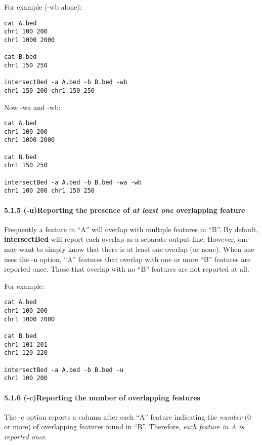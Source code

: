 \documentclass[letterpaper,10pt,english]{sphinxmanual}
\begin{document}
For example (-wb alone):

\begin{Verbatim}[commandchars=\\\{\}]
cat A.bed
chr1 100 200
chr1 1000 2000

cat B.bed
chr1 150 250

intersectBed -a A.bed -b B.bed -wb
chr1 150 200 chr1 150 250
\end{Verbatim}

Now -wa and -wb:

\begin{Verbatim}[commandchars=\\\{\}]
cat A.bed
chr1 100 200
chr1 1000 2000

cat B.bed
chr1 150 250

intersectBed -a A.bed -b B.bed -wa -wb
chr1 100 200 chr1 150 250
\end{Verbatim}


\paragraph{5.1.5 (-u)Reporting the presence of \emph{at least one} overlapping feature}
\label{content/intersectBed:u-reporting-the-presence-of-at-least-one-overlapping-feature}
Frequently a feature in ``A'' will overlap with multiple features in ``B''. By default, \textbf{intersectBed} will
report each overlap as a separate output line. However, one may want to simply know that there is at
least one overlap (or none). When one uses the -u option, ``A'' features that overlap with one or more
``B'' features are reported once. Those that overlap with no ``B'' features are not reported at all.

For example:

\begin{Verbatim}[commandchars=\\\{\}]
cat A.bed
chr1 100 200
chr1 1000 2000

cat B.bed
chr1 101 201
chr1 120 220

intersectBed -a A.bed -b B.bed -u
chr1 100 200
\end{Verbatim}


\paragraph{5.1.6 (-c)Reporting the number of overlapping features}
\label{content/intersectBed:c-reporting-the-number-of-overlapping-features}
The -c option reports a column after each ``A'' feature indicating the \emph{number} (0 or more) of overlapping
features found in ``B''. Therefore, \emph{each feature in A is reported once}.
\end{document}
